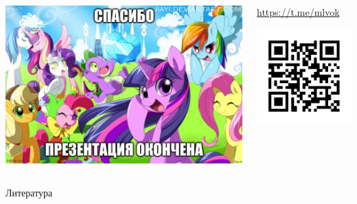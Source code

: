 \documentclass[11pt,aspectratio=169,handout]{beamer}
\begin{document}
\begin{frame}{}

\begin{columns}
\begin{column}{0.5\textwidth}
   \begin{center}
                \includegraphics[scale=0.25]{images/thankyou.jpeg}
   \end{center}
\end{column}
\begin{column}{0.4\textwidth}
   \begin{center}
                \url{https://t.me/mlvok}

                \includegraphics[scale=0.5]{images/tgqr.png}
   \end{center}
\end{column}
\end{columns}

\end{frame}

\begin{frame}[allowframebreaks]{Литература}




\end{frame}
\end{document}
